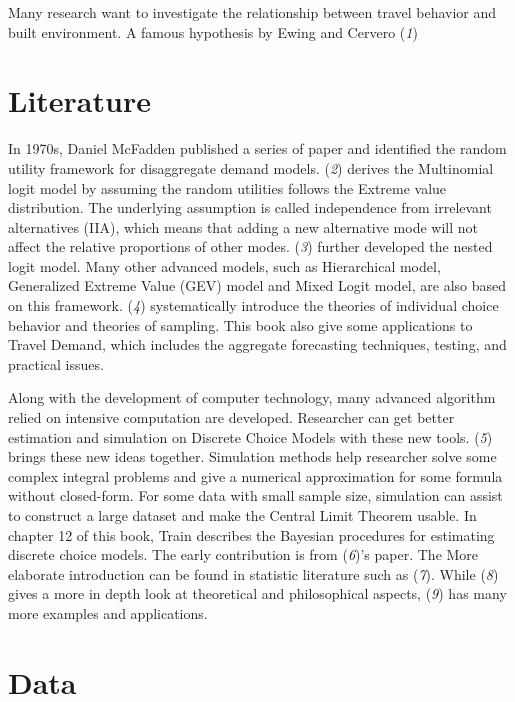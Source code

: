 \documentclass[numbered]{trbunofficial}
\begin{document}
Many research want to investigate the relationship between travel behavior and built environment. A famous hypothesis by Ewing and Cervero (\emph{1})

\hypertarget{literature}{%
\section{Literature}\label{literature}}

In 1970s, Daniel McFadden published a series of paper and identified the random utility framework for disaggregate demand models. (\emph{2}) derives the Multinomial logit model by assuming the random utilities follows the Extreme value distribution. The underlying assumption is called independence from irrelevant alternatives (IIA), which means that adding a new alternative mode will not affect the relative proportions of other modes. (\emph{3}) further developed the nested logit model. Many other advanced models, such as Hierarchical model, Generalized Extreme Value (GEV) model and Mixed Logit model, are also based on this framework.
(\emph{4}) systematically introduce the theories of individual choice behavior and theories of sampling. This book also give some applications to Travel Demand, which includes the aggregate forecasting techniques, testing, and practical issues.

Along with the development of computer technology, many advanced algorithm relied on intensive computation are developed. Researcher can get better estimation and simulation on Discrete Choice Models with these new tools. (\emph{5}) brings these new ideas together. Simulation methods help researcher solve some complex integral problems and give a numerical approximation for some formula without closed-form. For some data with small sample size, simulation can assist to construct a large dataset and make the Central Limit Theorem usable. In chapter 12 of this book, Train describes the Bayesian procedures for estimating discrete choice models. The early contribution is from (\emph{6})'s paper. The More elaborate introduction can be found in statistic literature such as (\emph{7}). While (\emph{8}) gives a more in depth look at theoretical and philosophical aspects, (\emph{9}) has many more examples and applications.

\hypertarget{data}{%
\section{Data}\label{data}}
\end{document}
